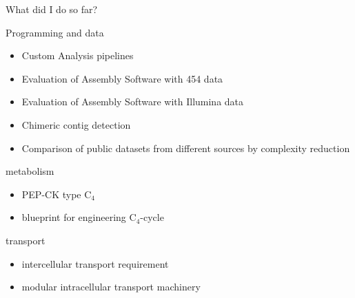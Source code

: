 What did I do so far?

Programming and data
\begin{itemize}
	\item Custom Analysis pipelines
	\item Evaluation of  Assembly Software with 454 data
	\item Evaluation of Assembly Software with Illumina data
	\item Chimeric contig detection
	\item Comparison of public datasets from different sources by complexity reduction
\end{itemize}

metabolism
\begin{itemize}
	\item {} PEP-CK type C$_4$
	\item {} blueprint for engineering C$_4$-cycle
\end{itemize}
	
transport
\begin{itemize}
	\item {} intercellular transport requirement
	\item {} modular intracellular transport machinery
\end{itemize}
